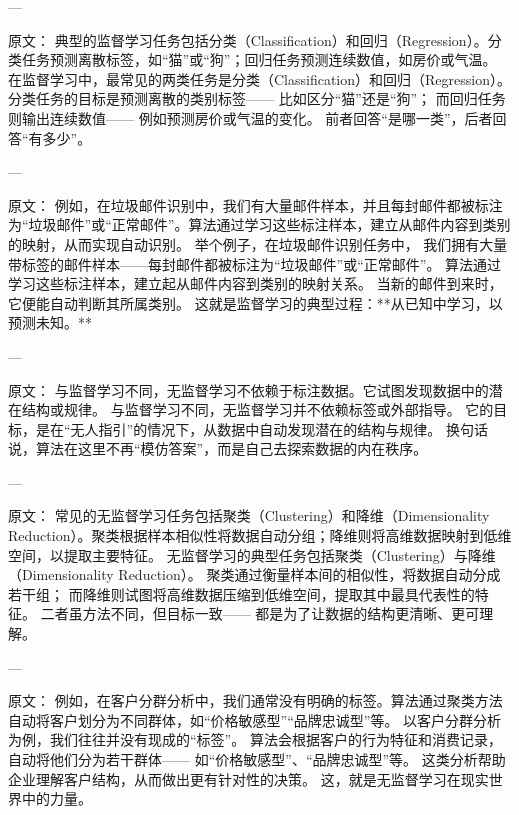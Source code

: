 ---

原文：
典型的监督学习任务包括分类（Classification）和回归（Regression）。分类任务预测离散标签，如“猫”或“狗”；回归任务预测连续数值，如房价或气温。
在监督学习中，最常见的两类任务是分类（Classification）和回归（Regression）。  
分类任务的目标是预测离散的类别标签——  
比如区分“猫”还是“狗”；  
而回归任务则输出连续数值——  
例如预测房价或气温的变化。  
前者回答“是哪一类”，后者回答“有多少”。

---

原文：
例如，在垃圾邮件识别中，我们有大量邮件样本，并且每封邮件都被标注为“垃圾邮件”或“正常邮件”。算法通过学习这些标注样本，建立从邮件内容到类别的映射，从而实现自动识别。
举个例子，在垃圾邮件识别任务中，  
我们拥有大量带标签的邮件样本——每封邮件都被标注为“垃圾邮件”或“正常邮件”。  
算法通过学习这些标注样本，建立起从邮件内容到类别的映射关系。  
当新的邮件到来时，它便能自动判断其所属类别。  
这就是监督学习的典型过程：**从已知中学习，以预测未知。**

---

原文：
与监督学习不同，无监督学习不依赖于标注数据。它试图发现数据中的潜在结构或规律。
与监督学习不同，无监督学习并不依赖标签或外部指导。  
它的目标，是在“无人指引”的情况下，从数据中自动发现潜在的结构与规律。  
换句话说，算法在这里不再“模仿答案”，而是自己去探索数据的内在秩序。

---

原文：
常见的无监督学习任务包括聚类（Clustering）和降维（Dimensionality Reduction）。聚类根据样本相似性将数据自动分组；降维则将高维数据映射到低维空间，以提取主要特征。
无监督学习的典型任务包括聚类（Clustering）与降维（Dimensionality Reduction）。  
聚类通过衡量样本间的相似性，将数据自动分成若干组；  
而降维则试图将高维数据压缩到低维空间，提取其中最具代表性的特征。  
二者虽方法不同，但目标一致——  
都是为了让数据的结构更清晰、更可理解。

---

原文：
例如，在客户分群分析中，我们通常没有明确的标签。算法通过聚类方法自动将客户划分为不同群体，如“价格敏感型”“品牌忠诚型”等。
以客户分群分析为例，我们往往并没有现成的“标签”。  
算法会根据客户的行为特征和消费记录，自动将他们分为若干群体——  
如“价格敏感型”、“品牌忠诚型”等。  
这类分析帮助企业理解客户结构，从而做出更有针对性的决策。  
这，就是无监督学习在现实世界中的力量。

